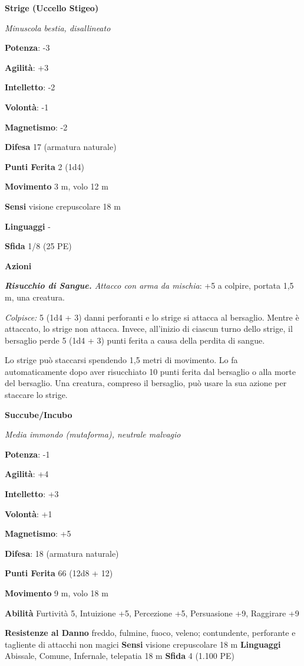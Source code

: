 \begin{multicols}{2}
\textbf{Strige (Uccello Stigeo)}

\emph{Minuscola bestia, disallineato}

\textbf{Potenza}: -3

\textbf{Agilità}: +3

\textbf{Intelletto}: -2

\textbf{Volontà}: -1

\textbf{Magnetismo}: -2

\textbf{Difesa} 17 (armatura naturale)

\textbf{Punti Ferita} 2 (1d4)

\textbf{Movimento} 3 m, volo 12 m

\textbf{Sensi} visione crepuscolare 18 m

\textbf{Linguaggi} -

\textbf{Sfida} 1/8 (25 PE)

\textbf{Azioni}

\emph{\textbf{Risucchio di Sangue.} Attacco con arma da mischia}: +5 a
colpire, portata 1,5 m, una creatura.

\emph{Colpisce:} 5 (1d4 + 3) danni perforanti e lo strige si attacca al
bersaglio. Mentre è attaccato, lo strige non attacca. Invece, all'inizio
di ciascun turno dello strige, il bersaglio perde 5 (1d4 + 3) punti
ferita a causa della perdita di sangue.

Lo strige può staccarsi spendendo 1,5 metri di movimento. Lo fa
automaticamente dopo aver risucchiato 10 punti ferita dal bersaglio o
alla morte del bersaglio. Una creatura, compreso il bersaglio, può usare
la sua azione per staccare lo strige.

\textbf{Succube/Incubo}

\emph{Media immondo (mutaforma), neutrale malvagio}

\textbf{Potenza}: -1

\textbf{Agilità}: +4

\textbf{Intelletto}: +3

\textbf{Volontà}: +1

\textbf{Magnetismo}: +5

\textbf{Difesa}: 18 (armatura naturale)

\textbf{Punti Ferita} 66 (12d8 + 12)

\textbf{Movimento} 9 m, volo 18 m

\textbf{Abilità} Furtività 5, Intuizione +5, Percezione +5, Persuasione
+9, Raggirare +9

\textbf{Resistenze al Danno} freddo, fulmine, fuoco, veleno;
contundente, perforante e tagliente di attacchi non magici
\textbf{Sensi} visione crepuscolare 18 m
\textbf{Linguaggi} Abissale, Comune, Infernale, telepatia 18 m
\textbf{Sfida} 4 (1.100 PE)


\end{multicols}

